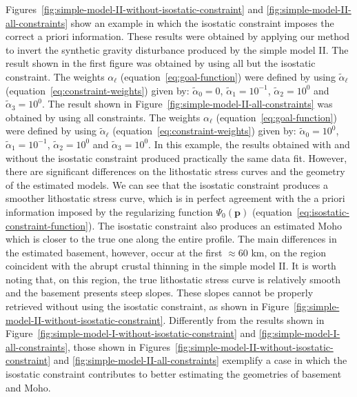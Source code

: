 \documentclass[manuscript]{geophysics}
\begin{document}
Figures~\ref{fig:simple-model-II-without-isostatic-constraint} and 
\ref{fig:simple-model-II-all-constraints}
show an example in which the isostatic constraint imposes the correct
a priori information. 
These results were obtained by applying our method to invert the synthetic gravity 
disturbance produced by the simple model II.
The result shown in the first figure was obtained by using all but 
the isostatic constraint. The weights $\alpha_{\ell}$ 
(equation~\ref{eq:goal-function}) were defined by
using $\tilde{\alpha}_{\ell}$ (equation~\ref{eq:constraint-weights}) given by: 
$\tilde{\alpha}_{0} = 0$, $\tilde{\alpha}_{1} = 10^{-1}$, 
$\tilde{\alpha}_{2} = 10^{0}$ and $\tilde{\alpha}_{3} = 10^{0}$.
The result shown in Figure~\ref{fig:simple-model-II-all-constraints} was
obtained by using all constraints. 
The weights $\alpha_{\ell}$ (equation~\ref{eq:goal-function}) were defined by
using $\tilde{\alpha}_{\ell}$ (equation~\ref{eq:constraint-weights}) given by: 
$\tilde{\alpha}_{0} = 10^{0}$, $\tilde{\alpha}_{1} = 10^{-1}$, 
$\tilde{\alpha}_{2} = 10^{0}$ and $\tilde{\alpha}_{3} = 10^{0}$.
In this example, the results obtained with and without the isostatic 
constraint produced practically the same data fit. However, there are 
significant differences on the lithostatic stress curves and the geometry of 
the estimated models. 
We can see that the isostatic constraint produces a smoother  
lithostatic stress curve, which is in perfect agreement with the a priori information
imposed by the regularizing function $\Psi_{0}(\mathbf{p})$
(equation~\ref{eq:isostatic-constraint-function}).
The isostatic constraint also produces an estimated Moho which is closer to the
true one along the entire profile.
The main differences in the estimated basement, however, occur at the 
first $\approx 60$ km, on the region coincident with the abrupt crustal thinning
in the simple model II.
It is worth noting that, on this region, the true lithostatic stress curve is
relatively smooth and the basement presents steep slopes.
These slopes cannot be properly retrieved without using the isostatic
constraint, as shown in Figure~\ref{fig:simple-model-II-without-isostatic-constraint}.
Differently from the results shown in 
Figure~\ref{fig:simple-model-I-without-isostatic-constraint} and
\ref{fig:simple-model-I-all-constraints},
those shown in
Figures~\ref{fig:simple-model-II-without-isostatic-constraint} and 
\ref{fig:simple-model-II-all-constraints}
exemplify a case in which the isostatic constraint contributes to
better estimating the geometries of basement and Moho.
\end{document}
